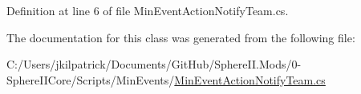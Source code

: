 Definition at line 6 of file Min\+Event\+Action\+Notify\+Team.\+cs.



The documentation for this class was generated from the following file\+:\begin{DoxyCompactItemize}
\item 
C\+:/\+Users/jkilpatrick/\+Documents/\+Git\+Hub/\+Sphere\+I\+I.\+Mods/0-\/\+Sphere\+I\+I\+Core/\+Scripts/\+Min\+Events/\mbox{\hyperlink{_min_event_action_notify_team_8cs}{Min\+Event\+Action\+Notify\+Team.\+cs}}\end{DoxyCompactItemize}
